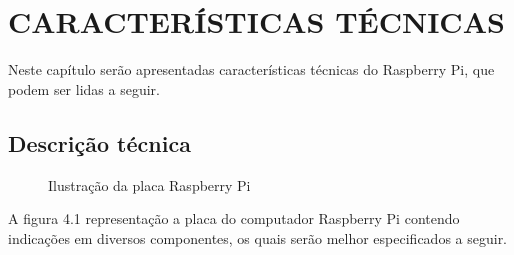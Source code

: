 \chapter{CARACTERÍSTICAS TÉCNICAS}

Neste capítulo serão apresentadas características técnicas do Raspberry Pi, que podem ser lidas a seguir.

\section{Descrição técnica}

\begin{figure}[ht]
    \centering
    \caption{Ilustração da placa Raspberry Pi}
\end{figure}

A figura 4.1 representação a placa do computador Raspberry Pi contendo indicações em diversos componentes, os quais serão melhor especificados a seguir.

